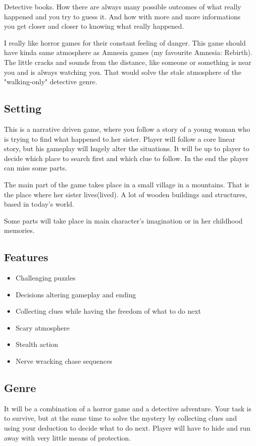 \documentclass[a4paper,10pt,english]{article}
\begin{document}
Detective books. How there are always many possible outcomes of what really happened and you try to guess it. And how with more and more informations you get closer and closer to knowing what really happened.\newline

I really like horror games for their constant feeling of danger. This game should have kinda same atmosphere as Amnesia games (my favourite Amnesia: Rebirth). The little cracks and sounds from the distance, like someone or something is near you and is always watching you. That would solve the stale atmosphere of the "walking-only" detective genre. 


\subsection*{Setting}
This is a narrative driven game, where you follow a story of a young woman who is trying to find what happened to her sister. Player will follow a core linear story, but his gameplay will hugely alter the situations. It will be up to player to decide which place to search first and which clue to follow. In the end the player can miss some parts.\newline

The main part of the game takes place in a small village in a mountains. That is the place where her sister lives(lived). A lot of wooden buildings and structures, based in today's world.\newline

Some parts will take place in main character's imagination or in her childhood memories.


\subsection*{Features}

\begin{itemize}
    \item Challenging puzzles
    \item Decisions altering gameplay and ending
    \item Collecting clues while having the freedom of what to do next
    \item Scary atmosphere
    \item Stealth action 
    \item Nerve wracking chase sequences
\end{itemize}


\subsection*{Genre}
It will be a combination of a horror game and a detective adventure. Your task is to survive, but at the same time to solve the mystery by collecting clues and using your deduction to decide what to do next. Player will have to hide and run away with very little means of protection.
\end{document}
